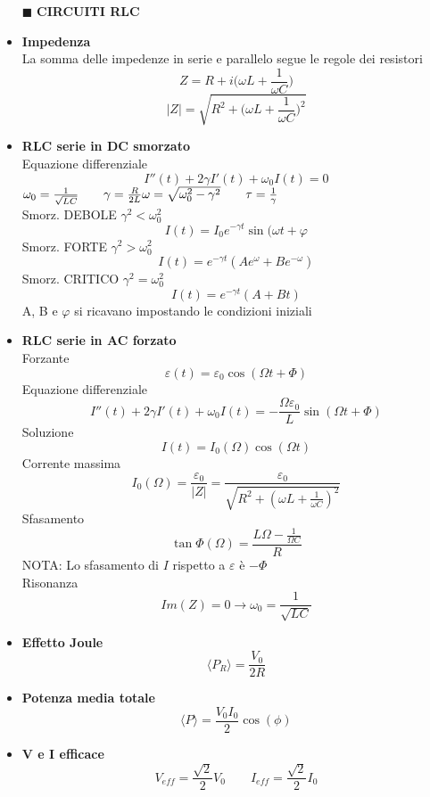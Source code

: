 \documentclass{book}
\newcommand{\g}{\textbf}
\newcommand{\e}{\begin{equation}}
\newcommand{\ex}{\end{equation} }
\renewcommand{\it}{\item[$\cdot$]}
\begin{document}
\begin{multicols}{4}
\begin{itemize}
\hline
\item [$\blacksquare$] \g{CIRCUITI RLC}
    \it \g{Impedenza} \\
        La somma delle impedenze in serie e parallelo segue le regole dei resistori
        \e{Z=R+i\biggl(\omega L+\frac{1}{\omega C}\biggr)} \ex
        \e{|Z|=\sqrt{R^2+\biggl(\omega L+\frac{1}{\omega C}\biggr)^2}} \ex
    \it \g{RLC serie in DC smorzato} \\
    Equazione differenziale
    \e{I''(t)+2\gamma I'(t)+\omega_0 I(t)=0} \ex
        $\omega_0=\frac{1}{\sqrt{LC}} \qquad \gamma=\frac{R}{2L} \\
        \omega=\sqrt{\omega_0^2-\gamma^2} \qquad \tau=\frac{1}{\gamma}$ \\
        Smorz. DEBOLE $\gamma^2<\omega_0^2$
        \e{I(t)=I_0 e^{-\gamma t} \sin(\omega t+\varphi} \ex
        Smorz. FORTE $\gamma^2>\omega_0^2$
        \e{I(t)=e^{-\gamma t}(Ae^\omega+Be^{-\omega})} \ex
        Smorz. CRITICO $\gamma^2=\omega_0^2$
        \e{I(t)=e^{-\gamma t}(A+Bt)} \ex
        A, B e $\varphi$ si ricavano impostando le condizioni iniziali
    \it \g{RLC serie in AC forzato} \\
        Forzante
        \e{\varepsilon(t)=\varepsilon_0\cos(\Omega t + \Phi)} \ex
        Equazione differenziale
        \e{I''(t)+2\gamma I'(t)+\omega_0 I(t)=-\frac{\Omega\varepsilon_0}{L}\sin(\Omega t + \Phi)} \ex
        Soluzione
        \e{I(t)=I_0(\Omega)\cos(\Omega t )} \ex
        Corrente massima
        \e{I_0(\Omega)=\frac{\varepsilon_0}{|Z|}=\frac{\varepsilon_0}{\sqrt{R^2+(\omega L+\frac{1}{\omega C})^2}}} \ex
        Sfasamento
        \e{\tan\Phi(\Omega)=\frac{L\Omega-\frac{1}{\Omega C}}{R}} \ex
        NOTA: Lo sfasamento di $I$ rispetto a $\varepsilon$ è $-\Phi$ \\
        Risonanza
        \e{Im(Z)=0 \rightarrow \omega_0=\frac{1}{\sqrt{LC}}} \ex
    \it \g{Effetto Joule}
        \e{\langle P_R\rangle=\frac{V_0}{2R}} \ex
    \it \g{Potenza media totale}
        \e{\langle P\rangle=\frac{V_0I_0}{2}\cos(\phi)} \ex
    \it \g{V e I efficace}
        \e{V_{eff}=\frac{\sqrt{2}}{2}V_0 \qquad I_{eff}=\frac{\sqrt{2}}{2}I_0} \ex


\end{itemize}
\end{multicols}
\end{document}
